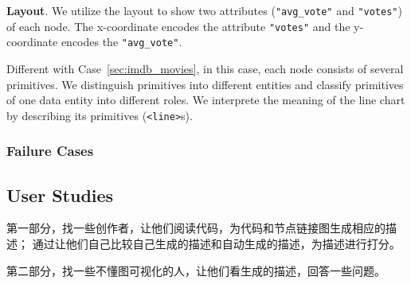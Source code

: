 \textbf{Layout}. We utilize the layout to show two attributes (\texttt{"avg\_vote"} and \texttt{"votes"}) of each node. The x-coordinate encodes the attribute \texttt{"votes"} and the y-coordinate encodes the \texttt{"avg\_vote"}.

Different with Case~\ref{sec:imdb_movies}, in this case, each node consists of several primitives.
We distinguish primitives into different entities and classify primitives of one data entity into different roles.
We interprete the meaning of the line chart by describing its primitives (\texttt{<line>}s).

\subsubsection{}

\subsubsection{Failure Cases}

\subsection{User Studies}
第一部分，找一些创作者，让他们阅读代码，为代码和节点链接图生成相应的描述；
通过让他们自己比较自己生成的描述和自动生成的描述，为描述进行打分。

第二部分，找一些不懂图可视化的人，让他们看生成的描述，回答一些问题。